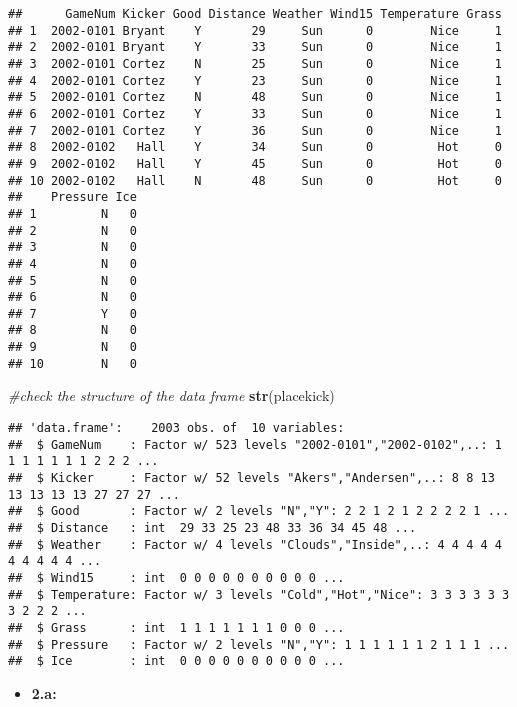 \documentclass[]{article}
\newenvironment{Shaded}{\begin{snugshade}}{\end{snugshade}}
\newcommand{\CommentTok}[1]{\textcolor[rgb]{0.56,0.35,0.01}{\textit{#1}}}
\newcommand{\KeywordTok}[1]{\textcolor[rgb]{0.13,0.29,0.53}{\textbf{#1}}}
\newcommand{\NormalTok}[1]{#1}
\providecommand{\tightlist}{%
  \setlength{\itemsep}{0pt}\setlength{\parskip}{0pt}}
\begin{document}
\begin{verbatim}
##      GameNum Kicker Good Distance Weather Wind15 Temperature Grass
## 1  2002-0101 Bryant    Y       29     Sun      0        Nice     1
## 2  2002-0101 Bryant    Y       33     Sun      0        Nice     1
## 3  2002-0101 Cortez    N       25     Sun      0        Nice     1
## 4  2002-0101 Cortez    Y       23     Sun      0        Nice     1
## 5  2002-0101 Cortez    N       48     Sun      0        Nice     1
## 6  2002-0101 Cortez    Y       33     Sun      0        Nice     1
## 7  2002-0101 Cortez    Y       36     Sun      0        Nice     1
## 8  2002-0102   Hall    Y       34     Sun      0         Hot     0
## 9  2002-0102   Hall    Y       45     Sun      0         Hot     0
## 10 2002-0102   Hall    N       48     Sun      0         Hot     0
##    Pressure Ice
## 1         N   0
## 2         N   0
## 3         N   0
## 4         N   0
## 5         N   0
## 6         N   0
## 7         Y   0
## 8         N   0
## 9         N   0
## 10        N   0
\end{verbatim}

\begin{Shaded}
\begin{Highlighting}[]
\CommentTok{#check the structure of the data frame}
\KeywordTok{str}\NormalTok{(placekick)}
\end{Highlighting}
\end{Shaded}

\begin{verbatim}
## 'data.frame':    2003 obs. of  10 variables:
##  $ GameNum    : Factor w/ 523 levels "2002-0101","2002-0102",..: 1 1 1 1 1 1 1 2 2 2 ...
##  $ Kicker     : Factor w/ 52 levels "Akers","Andersen",..: 8 8 13 13 13 13 13 27 27 27 ...
##  $ Good       : Factor w/ 2 levels "N","Y": 2 2 1 2 1 2 2 2 2 1 ...
##  $ Distance   : int  29 33 25 23 48 33 36 34 45 48 ...
##  $ Weather    : Factor w/ 4 levels "Clouds","Inside",..: 4 4 4 4 4 4 4 4 4 4 ...
##  $ Wind15     : int  0 0 0 0 0 0 0 0 0 0 ...
##  $ Temperature: Factor w/ 3 levels "Cold","Hot","Nice": 3 3 3 3 3 3 3 2 2 2 ...
##  $ Grass      : int  1 1 1 1 1 1 1 0 0 0 ...
##  $ Pressure   : Factor w/ 2 levels "N","Y": 1 1 1 1 1 1 2 1 1 1 ...
##  $ Ice        : int  0 0 0 0 0 0 0 0 0 0 ...
\end{verbatim}

\begin{itemize}
\tightlist
\item
  \textbf{2.a:}
\end{itemize}
\end{document}
